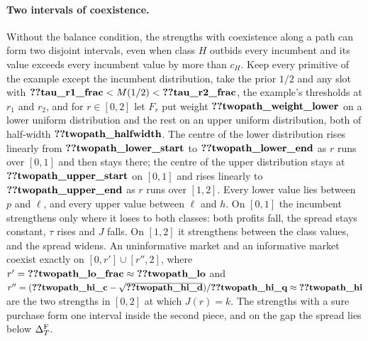 \paragraph{Two intervals of coexistence.}
Without the balance condition, the strengths with coexistence along a path can form two disjoint intervals, even
when class \(H\) outbids every incumbent and its value exceeds every incumbent value by more than \(c_H\). Keep every
primitive of the example except the incumbent distribution, take the prior \(1/2\) and any slot with
\(\reg{tau_r1_frac}<M(1/2)<\reg{tau_r2_frac}\), the example's thresholds at \(r_1\) and \(r_2\), and for
\(r\in[0,2]\) let \(F_r\) put weight \(\reg{twopath_weight_lower}\) on a lower uniform distribution and the rest on an upper
uniform distribution, both of half-width \(\reg{twopath_halfwidth}\). The centre of the lower distribution rises linearly from
\(\reg{twopath_lower_start}\) to \(\reg{twopath_lower_end}\) as \(r\) runs over \([0,1]\) and then stays there; the
centre of the upper distribution stays at \(\reg{twopath_upper_start}\) on \([0,1]\) and rises linearly to
\(\reg{twopath_upper_end}\) as \(r\) runs over \([1,2]\). Every lower value lies between \(p\) and
\(\ell\), and every upper value between \(\ell\) and \(h\). On \([0,1]\) the incumbent strengthens only where it loses
to both classes: both profits fall, the spread stays constant, \(\tau\) rises and \(J\) falls. On \([1,2]\) it
strengthens between the class values, and the spread widens. An uninformative market and an informative market coexist exactly
on \([0,r']\cup[r'',2]\), where \(r'=\reg{twopath_lo_frac}\approx\reg{twopath_lo}\) and
\(r''=(\reg{twopath_hi_c}-\sqrt{\reg{twopath_hi_d}})/\reg{twopath_hi_q}\approx\reg{twopath_hi}\) are the two strengths in
\([0,2]\) at which \(J(r)=k\). The strengths with a sure purchase form one interval inside the
second piece, and on the gap the spread lies below \(\Delta_T^{\rm F}\).

